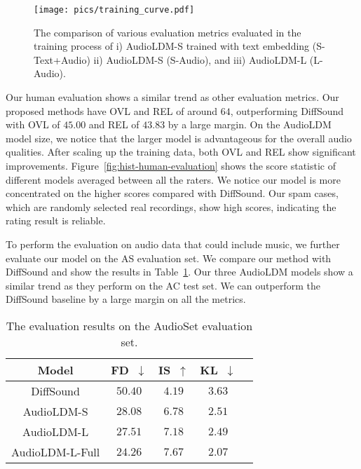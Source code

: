 \begin{figure}[tbp]
    \centering
    \texttt{[image: pics/training\_curve.pdf]}
    \caption{The comparison of various evaluation metrics evaluated in the training process of i) AudioLDM-S trained with text embedding (S-Text+Audio) ii) AudioLDM-S (S-Audio), and iii) AudioLDM-L (L-Audio).}
    \label{fig:training-steps-fd-is-kl}
\end{figure}

Our human evaluation shows a similar trend as other evaluation metrics. Our proposed methods have OVL and REL of around $64$, outperforming DiffSound with OVL of $45.00$ and REL of $43.83$ by a large margin. On the AudioLDM model size, we notice that the larger model is advantageous for the overall audio qualities. After scaling up the training data, both OVL and REL show significant improvements.
Figure~\ref{fig:hist-human-evaluation} shows the score statistic of different models averaged between all the raters. We notice our model is more concentrated on the higher scores compared with DiffSound. Our spam cases, which are randomly selected real recordings, show high scores, indicating the rating result is reliable.

To perform the evaluation on audio data that could include music, we further evaluate our model on the AS evaluation set. We compare our method with DiffSound and show the results in Table~\ref{tab: AudioSetResults}. Our three AudioLDM models show a similar trend as they perform on the AC test set. We can outperform the DiffSound baseline by a large margin on all the metrics. 

\begin{table}[htbp]
\small
\centering
\begin{tabular}{ccccc}
\toprule
       Model            & FD~$\downarrow$   & IS~$\uparrow$   & KL~$\downarrow$  \\
\midrule
DiffSound          & $50.40$ & $4.19$  & $3.63$ \\
AudioLDM-S      & $28.08$ & $6.78$ & $2.51$  \\
AudioLDM-L      & $27.51$ & $7.18$ & $2.49$ \\
AudioLDM-L-Full & $\mathbf{24.26}$ & $\mathbf{7.67}$ & $\mathbf{2.07}$ \\
\bottomrule
\end{tabular}
\caption{The evaluation results on the AudioSet evaluation set.}
\label{tab: AudioSetResults}
\end{table}


